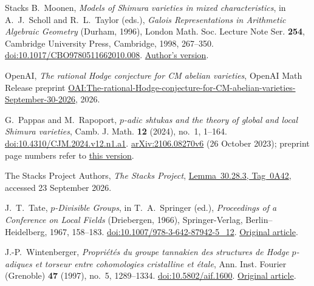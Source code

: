 \begin{thebibliography}{Stacks}
B.~Moonen,
\emph{Models of Shimura varieties in mixed characteristics},
in A.~J.~Scholl and R.~L.~Taylor (eds.),
\emph{Galois Representations in Arithmetic Algebraic Geometry}
(Durham, 1996), London Math. Soc. Lecture Note Ser. \textbf{254},
Cambridge University Press, Cambridge, 1998, 267--350.
\href{https://doi.org/10.1017/CBO9780511662010.008}{doi:10.1017/CBO9780511662010.008}.
\href{https://www.math.ru.nl/personal/bmoonen/Papers/SMCfinal.pdf}{Author's version}.

OpenAI,
\emph{The rational Hodge conjecture for CM abelian varieties},\newline
OpenAI Math Release preprint
\href{https://github.com/openai/math/blob/main/preprints/The-rational-Hodge-conjecture-for-CM-abelian-varieties-September-30-2026/paper.pdf}{OAI:The-rational-Hodge-conjecture-for-CM-abelian-varieties-September-30-2026},
2026.

G.~Pappas and M.~Rapoport,
\emph{$p$-adic shtukas and the theory of global and local Shimura varieties},
Camb. J. Math. \textbf{12} (2024), no.~1, 1--164.
\href{https://doi.org/10.4310/CJM.2024.v12.n1.a1}{doi:10.4310/CJM.2024.v12.n1.a1}.
\href{https://arxiv.org/abs/2106.08270v6}{arXiv:2106.08270v6}
(26 October 2023); preprint page numbers refer to
\href{https://arxiv.org/pdf/2106.08270v6}{this version}.

The Stacks Project Authors,
\emph{The Stacks Project},
\href{https://stacks.math.columbia.edu/tag/0A42}{Lemma~30.28.3, Tag~0A42},
accessed 23 September 2026.

J.~T.~Tate,
\emph{$p$-Divisible Groups},
in T.~A.~Springer (ed.), \emph{Proceedings of a Conference on Local Fields}
(Driebergen, 1966), Springer-Verlag, Berlin--Heidelberg, 1967, 158--183.
\href{https://doi.org/10.1007/978-3-642-87942-5_12}{doi:10.1007/978-3-642-87942-5\_12}.
\href{https://www.math.purdue.edu/~tongliu/teaching/598/p-divisible.pdf}{Original article}.

J.-P.~Wintenberger,
\emph{Propri\'et\'es du groupe tannakien des structures de Hodge $p$-adiques
et torseur entre cohomologies cristalline et \'etale},
Ann. Inst. Fourier (Grenoble) \textbf{47} (1997), no.~5, 1289--1334.
\href{https://doi.org/10.5802/aif.1600}{doi:10.5802/aif.1600}.
\href{https://www.numdam.org/item/10.5802/aif.1600.pdf}{Original article}.

\end{thebibliography}
